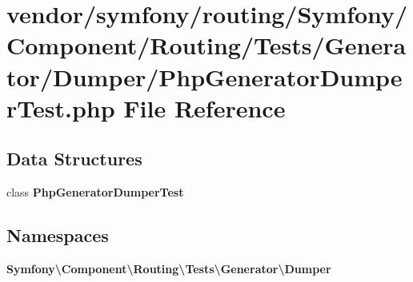 \section{vendor/symfony/routing/\+Symfony/\+Component/\+Routing/\+Tests/\+Generator/\+Dumper/\+Php\+Generator\+Dumper\+Test.php File Reference}
\label{_php_generator_dumper_test_8php}
\subsection*{Data Structures}
\begin{DoxyCompactItemize}
\item 
class {\bf Php\+Generator\+Dumper\+Test}
\end{DoxyCompactItemize}
\subsection*{Namespaces}
\begin{DoxyCompactItemize}
\item 
 {\bf Symfony\textbackslash{}\+Component\textbackslash{}\+Routing\textbackslash{}\+Tests\textbackslash{}\+Generator\textbackslash{}\+Dumper}
\end{DoxyCompactItemize}
